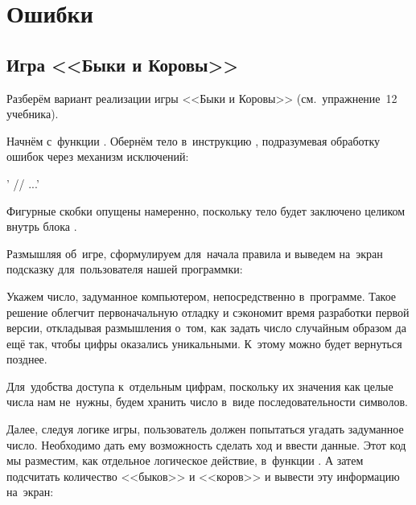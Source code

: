 
\chapter{Ошибки}

\section{Игра <<Быки и Коровы>>}
Разберём вариант реализации игры <<Быки и Коровы>> (см.~упражнение~12  учебника).

Начнём с~функции . Обернём тело в~инструкцию , подразумевая обработку ошибок через механизм исключений:

\cpp'  // ...'

\noindent Фигурные скобки  опущены намеренно, поскольку тело будет заключено целиком внутрь блока .

Размышляя об~игре, сформулируем для~начала правила и выведем на~экран подсказку для~пользователя нашей программки:


Укажем число, задуманное компьютером, непосредственно в~программе. Такое решение облегчит первоначальную отладку и сэкономит время разработки первой версии, откладывая размышления о~том, как задать число случайным образом да ещё так, чтобы цифры оказались уникальными. К~этому можно будет вернуться позднее.

Для~удобства доступа к~отдельным цифрам, поскольку их значения как целые числа нам не~нужны, будем хранить число в~виде последовательности символов.


Далее, следуя логике игры, пользователь должен попытаться угадать задуманное число. Необходимо дать ему возможность сделать ход и ввести данные. Этот код мы разместим, как отдельное логическое действие, в~функции . А затем подсчитать количество <<быков>> и <<коров>> и вывести эту информацию на~экран:

